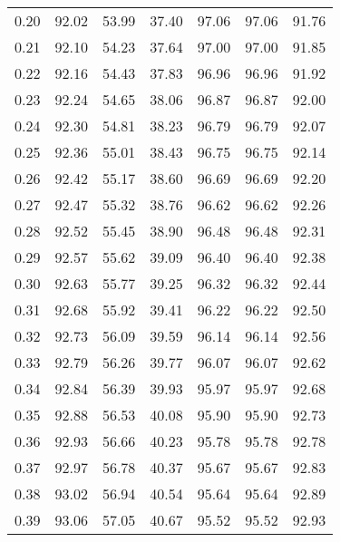 \begin{tabular}{|c|c|c|c|c|c|c|}
      0.20 &     92.02 &     53.99 &      37.40 &   97.06 &      97.06 &         91.76 \\
      0.21 &     92.10 &     54.23 &      37.64 &   97.00 &      97.00 &         91.85 \\
      0.22 &     92.16 &     54.43 &      37.83 &   96.96 &      96.96 &         91.92 \\
      0.23 &     92.24 &     54.65 &      38.06 &   96.87 &      96.87 &         92.00 \\
      0.24 &     92.30 &     54.81 &      38.23 &   96.79 &      96.79 &         92.07 \\
      0.25 &     92.36 &     55.01 &      38.43 &   96.75 &      96.75 &         92.14 \\
      0.26 &     92.42 &     55.17 &      38.60 &   96.69 &      96.69 &         92.20 \\
      0.27 &     92.47 &     55.32 &      38.76 &   96.62 &      96.62 &         92.26 \\
      0.28 &     92.52 &     55.45 &      38.90 &   96.48 &      96.48 &         92.31 \\
      0.29 &     92.57 &     55.62 &      39.09 &   96.40 &      96.40 &         92.38 \\
      0.30 &     92.63 &     55.77 &      39.25 &   96.32 &      96.32 &         92.44 \\
      0.31 &     92.68 &     55.92 &      39.41 &   96.22 &      96.22 &         92.50 \\
      0.32 &     92.73 &     56.09 &      39.59 &   96.14 &      96.14 &         92.56 \\
      0.33 &     92.79 &     56.26 &      39.77 &   96.07 &      96.07 &         92.62 \\
      0.34 &     92.84 &     56.39 &      39.93 &   95.97 &      95.97 &         92.68 \\
      0.35 &     92.88 &     56.53 &      40.08 &   95.90 &      95.90 &         92.73 \\
      0.36 &     92.93 &     56.66 &      40.23 &   95.78 &      95.78 &         92.78 \\
      0.37 &     92.97 &     56.78 &      40.37 &   95.67 &      95.67 &         92.83 \\
      0.38 &     93.02 &     56.94 &      40.54 &   95.64 &      95.64 &         92.89 \\
      0.39 &     93.06 &     57.05 &      40.67 &   95.52 &      95.52 &         92.93 \\

\end{tabular}
